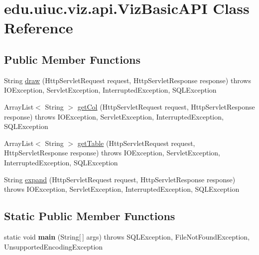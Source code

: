 \hypertarget{classedu_1_1uiuc_1_1viz_1_1api_1_1_viz_basic_a_p_i}{}\section{edu.\+uiuc.\+viz.\+api.\+Viz\+Basic\+A\+PI Class Reference}
\label{classedu_1_1uiuc_1_1viz_1_1api_1_1_viz_basic_a_p_i}
\subsection*{Public Member Functions}
\begin{DoxyCompactItemize}
\item 
String \mbox{\hyperlink{classedu_1_1uiuc_1_1viz_1_1api_1_1_viz_basic_a_p_i_adbb1a2ed104907dc8408a9c4f9218614}{draw}} (Http\+Servlet\+Request request, Http\+Servlet\+Response response)  throws I\+O\+Exception, Servlet\+Exception, Interrupted\+Exception, S\+Q\+L\+Exception 
\item 
Array\+List$<$ String $>$ \mbox{\hyperlink{classedu_1_1uiuc_1_1viz_1_1api_1_1_viz_basic_a_p_i_a0c2d23536f9202494daf32510029812e}{get\+Col}} (Http\+Servlet\+Request request, Http\+Servlet\+Response response)  throws I\+O\+Exception, Servlet\+Exception, Interrupted\+Exception, S\+Q\+L\+Exception 
\item 
Array\+List$<$ String $>$ \mbox{\hyperlink{classedu_1_1uiuc_1_1viz_1_1api_1_1_viz_basic_a_p_i_a500d3fe640725e0463a129461c8941d2}{get\+Table}} (Http\+Servlet\+Request request, Http\+Servlet\+Response response)  throws I\+O\+Exception, Servlet\+Exception, Interrupted\+Exception, S\+Q\+L\+Exception 
\item 
String \mbox{\hyperlink{classedu_1_1uiuc_1_1viz_1_1api_1_1_viz_basic_a_p_i_ae245c3e253abd0330e8c0c4897dda1eb}{expand}} (Http\+Servlet\+Request request, Http\+Servlet\+Response response)  throws I\+O\+Exception, Servlet\+Exception, Interrupted\+Exception, S\+Q\+L\+Exception 
\end{DoxyCompactItemize}
\subsection*{Static Public Member Functions}
\begin{DoxyCompactItemize}
\item 
\mbox{\label{classedu_1_1uiuc_1_1viz_1_1api_1_1_viz_basic_a_p_i_ae23b183c1ede0018c57334c922062d89}} 
static void {\bfseries main} (String\mbox{[}$\,$\mbox{]} args)  throws S\+Q\+L\+Exception, File\+Not\+Found\+Exception, Unsupported\+Encoding\+Exception
\end{DoxyCompactItemize}


